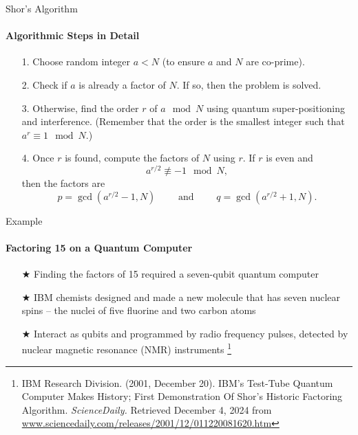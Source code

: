 \documentclass{beamer}
\begin{document}


\begin{frame}{Shor's Algorithm}
	\framesubtitle{Algorithmic Steps in Detail}
	\begin{itemize}
		\item[1.] Choose random integer \(a < N\) (to ensure \(a\) and \(N\) are co-prime).
		\pause
		\item[2.] Check if \(a\) is already a factor of \(N\). If so, then the problem is solved.
		\pause
		\item[3.] Otherwise, find the order \(r\) of \(a \mod N\) using quantum super-positioning and interference. (Remember that the order is the smallest integer such that \(a^r \equiv 1 \mod N\).)
		\pause
		\item[4.] Once \(r\) is found, compute the factors of \(N\) using \(r\). If \(r\) is even and 
		\[
			a^{r/2} \not\equiv -1 \mod N,
		\] 
		then the factors are 
		\[
			p = \gcd(a^{r/2} - 1, N) \qquad \text{ and } \qquad q = \gcd(a^{r/2} + 1, N).
		\] 
	\end{itemize}
	
\end{frame}




\begin{frame}{Example}
    \framesubtitle{Factoring 15 on a Quantum Computer}
    \begin{itemize}
        \item[$\bigstar$] Finding the factors of 15 required a seven-qubit quantum computer 
        \item[$\bigstar$] IBM chemists designed and made a new molecule that has seven nuclear spins -- the nuclei of five fluorine and two carbon atoms
        \item[$\bigstar$] Interact as qubits and programmed by radio frequency pulses, detected by nuclear magnetic resonance (NMR) instruments \footnote{IBM Research Division. (2001, December 20). IBM's Test-Tube Quantum Computer Makes History; First Demonstration Of Shor's Historic Factoring Algorithm. \textit{ScienceDaily.} Retrieved December 4, 2024 from \url{www.sciencedaily.com/releases/2001/12/011220081620.htm}} \end{itemize}
\end{frame}
\end{document}
